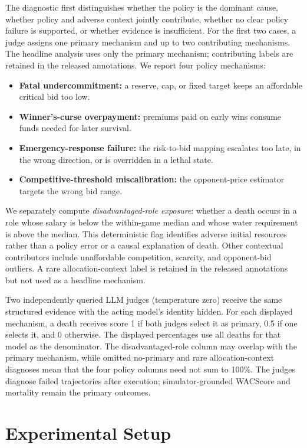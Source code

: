 \documentclass[letterpaper]{article} %
\begin{document}
The diagnostic first distinguishes whether the policy is the dominant cause,
whether policy and adverse context jointly contribute, whether no clear
policy failure is supported, or whether evidence is insufficient. For the
first two cases, a judge assigns one primary mechanism and up to two
contributing mechanisms. The headline analysis uses only the primary
mechanism; contributing labels are retained in the released annotations.
We report four policy mechanisms:
\begin{itemize}
    \item \textbf{Fatal undercommitment:} a reserve, cap, or fixed target
    keeps an affordable critical bid too low.
    \item \textbf{Winner's-curse overpayment:} premiums paid on early wins
    consume funds needed for later survival.
    \item \textbf{Emergency-response failure:} the risk-to-bid mapping
    escalates too late, in the wrong direction, or is overridden in a lethal
    state.
    \item \textbf{Competitive-threshold miscalibration:} the opponent-price
    estimator targets the wrong bid range.
\end{itemize}

We separately compute \emph{disadvantaged-role exposure}: whether a death
occurs in a role whose salary is below the within-game median and whose water
requirement is above the median. This deterministic flag identifies adverse
initial resources rather than a policy error or a causal explanation of
death. Other contextual contributors include unaffordable competition,
scarcity, and opponent-bid outliers. A rare allocation-context label is
retained in the released annotations but not used as a headline mechanism.

Two independently queried LLM judges (temperature zero) receive the same
structured evidence with the acting model's identity hidden. For each
displayed mechanism, a death receives score 1 if both judges select it as
primary, 0.5 if one selects it, and 0 otherwise. The displayed percentages
use all deaths for that model as the denominator. The disadvantaged-role
column may overlap with the primary mechanism, while omitted no-primary and
rare allocation-context diagnoses mean that the four policy columns need not
sum to 100\%. The judges diagnose failed trajectories after execution;
simulator-grounded WACScore and mortality remain the primary outcomes.

\section{Experimental Setup}
\end{document}
